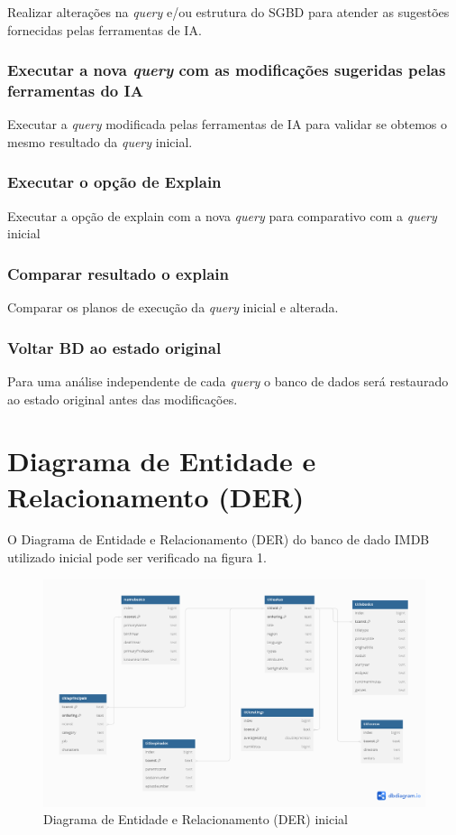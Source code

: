 \documentclass[12pt]{article}
\begin{document}
Realizar alterações na \emph{query} e/ou estrutura do SGBD para atender as sugestões fornecidas pelas ferramentas de IA.

\subsubsection{Executar a nova \emph{query} com as modificações sugeridas pelas ferramentas do IA}

Executar a \emph{query} modificada pelas ferramentas de IA para validar se obtemos o mesmo resultado da \emph{query} inicial.

\subsubsection{Executar o opção de Explain}

Executar a opção de explain com a nova \emph{query} para comparativo com a \emph{query} inicial

\subsubsection{Comparar resultado o explain}

Comparar os planos de execução da \emph{query} inicial e alterada.

\subsubsection{Voltar BD ao estado original}

Para uma análise independente de cada \emph{query} o banco de dados será restaurado ao estado original antes das modificações.

\clearpage
\section{Diagrama de Entidade e Relacionamento (DER)}

O Diagrama de Entidade e Relacionamento (DER) do banco de dado IMDB utilizado inicial pode ser verificado na figura 1.

\begin{figure}[ht]
\centering
\includegraphics[width=.5\textwidth]{IMDB_DER.png}
\caption{Diagrama de Entidade e Relacionamento (DER) inicial}
\end{figure}
\end{document}
